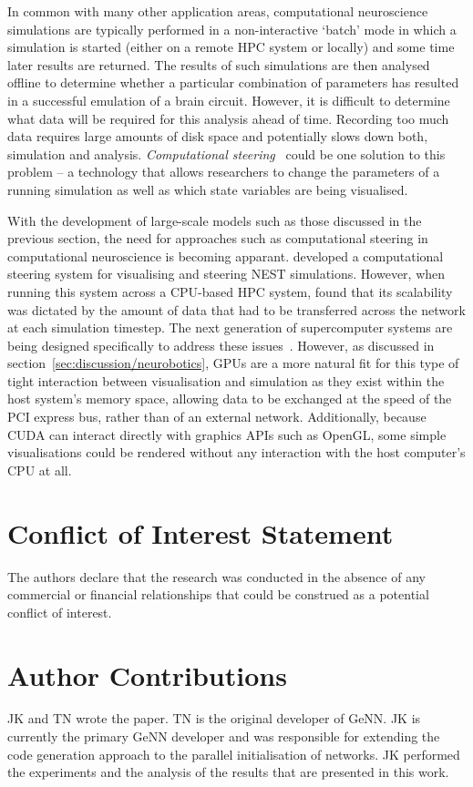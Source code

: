 \documentclass[utf8]{frontiersSCNS} %
\begin{document}
In common with many other application areas, computational neuroscience simulations are typically performed in a non-interactive `batch' mode in which a simulation is started (either on a remote HPC system or locally) and some time later results are returned.
The results of such simulations are then analysed offline to determine whether a particular combination of parameters has resulted in a successful emulation of a brain circuit.
However, it is difficult to determine what data will be required for this analysis ahead of time.
Recording too much data requires large amounts of disk space and potentially slows down both, simulation and analysis.
\textit{Computational steering}~\citep{Parker1997} could be one solution to this problem -- a technology that allows researchers to change the parameters of a running simulation as well as which state variables are being visualised.

With the development of large-scale models such as those discussed in the previous section, the need for approaches such as computational steering in computational neuroscience is becoming apparant.
\citet{Nowke2018} developed a computational steering system for visualising and steering NEST simulations.
However, when running this system across a CPU-based HPC system, \citeauthor{Nowke2018} found that its scalability was dictated by the amount of data that had to be transferred across the network at each simulation timestep.
The next generation of supercomputer systems are being designed specifically to address these issues~\citep{Lippert2014}.
However, as discussed in section~\ref{sec:discussion/neurobotics}, GPUs are a more natural fit for this type of tight interaction between visualisation and simulation as they exist within the host system's memory space, allowing data to be exchanged at the speed of the PCI express bus, rather than of an external network.
Additionally, because CUDA can interact directly with graphics APIs such as OpenGL, some simple visualisations could be rendered without any interaction with the host computer's CPU at all.

\section*{Conflict of Interest Statement}
The authors declare that the research was conducted in the absence of any commercial or financial relationships that could be construed as a potential conflict of interest.

\section*{Author Contributions}
JK and TN wrote the paper.
TN is the original developer of GeNN.
JK is currently the primary GeNN developer and was responsible for extending the code generation approach to the parallel initialisation of networks.
JK performed the experiments and the analysis of the results that are presented in this work.
\end{document}

